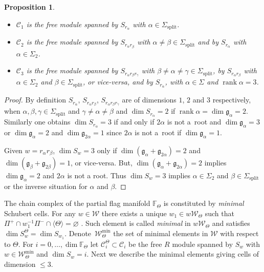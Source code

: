 \documentclass[10pt,a4paper]{amsart}
\numberwithin{equation}{section}
\newtheorem{Proposition}[Theorem]{Proposition}
 { \theoremstyle{definition}
\newtheorem{Definition}[Theorem]{Definition}
\newtheorem{Note}[Theorem]{Note}
\newtheorem{Example}[Theorem]{Example}
\newtheorem{Remark}[Theorem]{Remark} }
\newcommand{\F}{\mathbb F}
\begin{document}
\begin{Proposition}\label{pro.chains}\quad
\begin{itemize}\itemsep=0pt
\item $\mathcal{C}_1$ is the free module spanned by $S_{r_\alpha}$ with $\alpha\in \Sigma_{\mathrm{split}}$.
\item $\mathcal{C}_{2}$ is the free module spanned by $S_{r_{\alpha}r_{\beta }}$ with $\alpha \neq \beta \in \Sigma _{\mathrm{split}}$ and by $S_{r_{\alpha }}$ with $\alpha \in \Sigma _{2}$.
\item $\mathcal{C}_{3}$ is the free module spanned by $S_{r_{\alpha}r_{\beta }r_{\gamma }}$ with $\beta \neq \alpha \neq \gamma \in \Sigma _{\mathrm{split}}$, by $S_{r_{\alpha }r_{\beta }}$ with $\alpha \in \Sigma_{2} $ and $\beta \in \Sigma _{\mathrm{split}}$, or vice-versa, and by $S_{r_{\alpha }}$, with $\alpha \in \Sigma $ and $\operatorname{rank}\alpha =3$.
\end{itemize}
\end{Proposition}

\begin{proof}By definition $S_{r_{\alpha }}$, $S_{r_{\alpha }r_{\beta }}$, $S_{r_{\alpha}r_{\beta }r_{\gamma }}$ are of dimensions $1$, $2$ and $3$ respectively, when $\alpha,\beta,\gamma \in \Sigma _{\mathrm{split}}$ and $\gamma \neq \alpha \neq \beta $ and $\dim S_{r_{\alpha }}=2$ if $\operatorname{rank}\alpha=\dim \mathfrak{g}_{\alpha }=2$. Similarly one obtains $\dim S_{r_{\alpha}}=3$ if and only if $2\alpha $ is not a~root and $\dim \mathfrak{g}_{\alpha}=3$ or $\dim \mathfrak{g}_{\alpha }=2$ and $\dim \mathfrak{g}_{2\alpha }=1$ since $2\alpha $ is not a~root if $\dim \mathfrak{g}_{\alpha }=1$.

Given $w=r_{\alpha }r_{\beta }$, $\dim S_{w}=3$ only if $\dim (\mathfrak{g}_{\alpha }+\mathfrak{g}_{2\alpha })=2$ and $\dim (\mathfrak{g}_{\beta }+\mathfrak{g}_{2\beta })=1$, or vice-versa. But, $\dim (\mathfrak{g}_{\alpha}+\mathfrak{g}_{2\alpha })=2$ implies $\dim \mathfrak{g}_{\alpha }=2$ and $2\alpha $ is not a root. Thus $\dim S_{w}=3$ implies $\alpha \in \Sigma _{2}$ and $\beta \in \Sigma _{\mathrm{split}}$ or the inverse situation for $%
\alpha $ and $\beta $.
\end{proof}

The chain complex of the partial flag manifold $\F_\Theta$ is constituted by {\em minimal} Schubert cells. For any $w\in \mathcal{W}$ there exists a unique $w_{1}\in w\mathcal{W}_{\Theta }$ such that $\Pi ^{+}\cap w_{1}^{-1}\Pi ^{-}\cap \langle\Theta\rangle =\varnothing$ \cite[Lemma~3.1]{RSM}. Such element is called {\em minimal} in $w\mathcal{W}_{\Theta }$ and satisfies $\dim S_{w}^{\Theta}=\dim S_{w_{1}}$. Deno\-te~$\mathcal{W}_{\Theta }^{\min }$ the set of minimal elements in $\mathcal{W}$ with respect to $\Theta $. For $i=0,\ldots,\dim \mathbb{F}_{\Theta }$ let $\mathcal{C}_{i}^{\Theta }\subset \mathcal{C}_{i}$ be the free $R$ module spanned by $S_{w}$ with $w\in \mathcal{W}_{\Theta}^{\min }$ and $\dim S_{w}=i$. Next we describe the minimal elements giving cells of dimension $\leq 3$.
\end{document}
